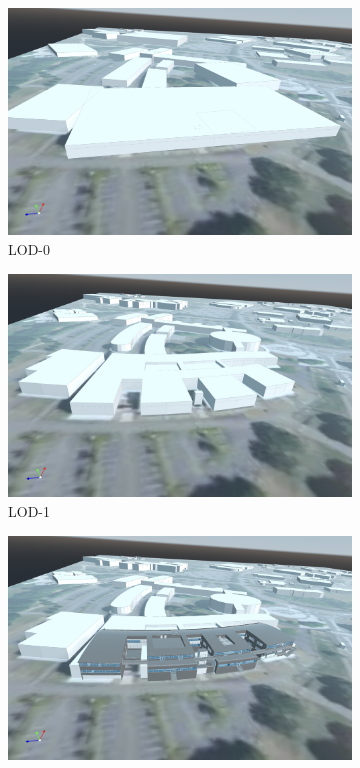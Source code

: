 \documentclass[runningheads]{llncs}
\begin{document}
\begin{figure}[htbp]
\centering
\begin{subfigure}{.4\textwidth}
  \centering
  \includegraphics[width=\linewidth]{buildings-lod0.png}
  \caption{LOD-0}
  \label{fig:sub1}
\end{subfigure}%
\begin{subfigure}{.4\textwidth}
  \centering
  \includegraphics[width=\linewidth]{buildings-lod1.png}
  \caption{LOD-1}
  \label{fig:sub2}
\end{subfigure}
\begin{subfigure}{.4\textwidth}
  \centering
  \includegraphics[width=\linewidth]{buildings-lod2.png}

\end{subfigure}
\end{figure}
\end{document}
